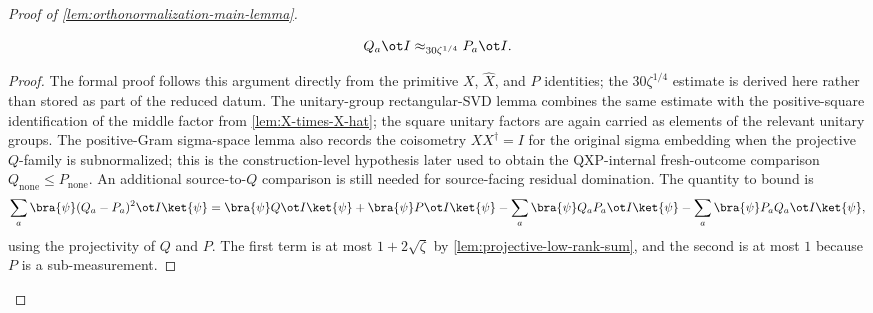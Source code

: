 \begin{proof}[Proof of \ref{lem:orthonormalization-main-lemma}]
	\begin{lemma}[$P$ is close to~$Q$]\label{lem:P-Q-approx}
		\leanok
		\begin{equation*}
			Q_a \ot I \approx_{30\zeta^{1/4}} P_a \ot I.
		\end{equation*}
	\end{lemma}
	\begin{proof}
		\leanok
		The formal proof follows this argument directly from the primitive
		$X$, $\widehat X$, and $P$ identities; the $30\zeta^{1/4}$ estimate is
		derived here rather than stored as part of the reduced datum.  The
		unitary-group rectangular-SVD lemma combines the same estimate with the
		positive-square identification of the middle factor from
		\ref{lem:X-times-X-hat}; the square unitary factors are again carried as
		elements of the relevant unitary groups.  The
		positive-Gram sigma-space lemma also records the coisometry
		\(X X^\dagger=I\) for the original sigma embedding when the projective
		\(Q\)-family is subnormalized; this is the construction-level hypothesis
		later used to obtain the QXP-internal fresh-outcome comparison
		\(Q_{\mathrm{none}} \leq P_{\mathrm{none}}\).  An additional
		source-to-\(Q\) comparison is still needed for source-facing residual
		domination.
		The quantity to bound is
		\begin{equation}\label{eq:P-Q-thing-to-bound}
			\sum_a \bra{\psi} (Q_a-P_a)^2 \ot I \ket{\psi}
			=
			\bra{\psi} Q \ot I \ket{\psi}
			+
			\bra{\psi} P \ot I \ket{\psi}
			-
			\sum_a \bra{\psi} Q_aP_a \ot I \ket{\psi}
			-
			\sum_a \bra{\psi} P_aQ_a \ot I \ket{\psi},
		\end{equation}
		using the projectivity of $Q$ and $P$. The first term is at most $1+2\sqrt{\zeta}$ by \ref{lem:projective-low-rank-sum}, and the second is at most $1$ because $P$ is a sub-measurement.


\end{proof}
\end{proof}
